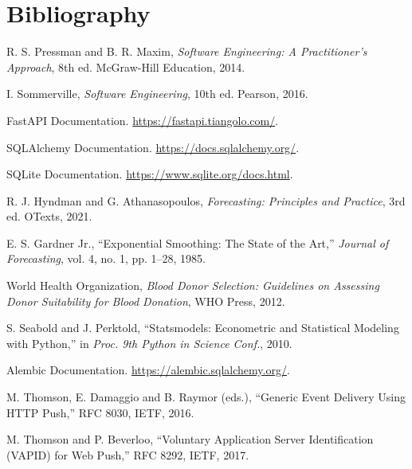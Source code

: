 \documentclass[12pt,a4paper,twoside]{report}
\begin{document}
\chapter*{Bibliography}
\thispagestyle{plain}
\begin{description}[leftmargin=!,labelwidth=2.6cm,labelsep=0.4cm,itemsep=6pt,font=\normalfont]
\item[{[Pres14]}] R. S. Pressman and B. R. Maxim, \emph{Software Engineering: A Practitioner's Approach}, 8th ed. McGraw-Hill Education, 2014.
\item[{[Somm16]}] I. Sommerville, \emph{Software Engineering}, 10th ed. Pearson, 2016.
\item[{[FastAPI]}] FastAPI Documentation. \url{https://fastapi.tiangolo.com/}.
\item[{[SQLAlch]}] SQLAlchemy Documentation. \url{https://docs.sqlalchemy.org/}.
\item[{[SQLite]}] SQLite Documentation. \url{https://www.sqlite.org/docs.html}.
\item[{[Hyndman21]}] R. J. Hyndman and G. Athanasopoulos, \emph{Forecasting: Principles and Practice}, 3rd ed. OTexts, 2021.
\item[{[Gardner85]}] E. S. Gardner Jr., ``Exponential Smoothing: The State of the Art,'' \emph{Journal of Forecasting}, vol. 4, no. 1, pp. 1--28, 1985.
\item[{[WHO17]}] World Health Organization, \emph{Blood Donor Selection: Guidelines on Assessing Donor Suitability for Blood Donation}, WHO Press, 2012.
\item[{[Statsm10]}] S. Seabold and J. Perktold, ``Statsmodels: Econometric and Statistical Modeling with Python,'' in \emph{Proc. 9th Python in Science Conf.}, 2010.
\item[{[Alembic]}] Alembic Documentation. \url{https://alembic.sqlalchemy.org/}.
\item[{[RFC8030]}] M. Thomson, E. Damaggio and B. Raymor (eds.), ``Generic Event Delivery Using HTTP Push,'' RFC 8030, IETF, 2016.
\item[{[RFC8292]}] M. Thomson and P. Beverloo, ``Voluntary Application Server Identification (VAPID) for Web Push,'' RFC 8292, IETF, 2017.
\end{description}
\end{document}
